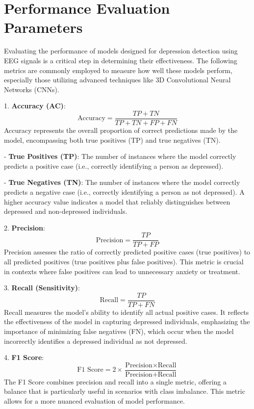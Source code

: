 \documentclass[conference]{IEEEtran}
\begin{document}
\section{Performance Evaluation Parameters}

Evaluating the performance of models designed for depression detection using EEG signals is a critical step in determining their effectiveness. The following metrics are commonly employed to measure how well these models perform, especially those utilizing advanced techniques like 3D Convolutional Neural Networks (CNNs).




1. \textbf{Accuracy (AC)}:
   \[
   \text{Accuracy} = \frac{TP + TN}{TP + TN + FP + FN} \tag{6}
   \]
   Accuracy represents the overall proportion of correct predictions made by the model, encompassing both true positives (TP) and true negatives (TN).
   
   - \textbf{True Positives (TP)}: The number of instances where the model correctly predicts a positive case (i.e., correctly identifying a person as depressed).
   
   - \textbf{True Negatives (TN)}: The number of instances where the model correctly predicts a negative case (i.e., correctly identifying a person as not depressed). A higher accuracy value indicates a model that reliably distinguishes between depressed and non-depressed individuals.

2. \textbf{Precision}:
   \[
   \text{Precision} = \frac{TP}{TP + FP}  \tag{7}
   \]
   Precision assesses the ratio of correctly predicted positive cases (true positives) to all predicted positives (true positives plus false positives). This metric is crucial in contexts where false positives can lead to unnecessary anxiety or treatment.

3. \textbf{Recall (Sensitivity)}:
   \[
   \text{Recall} = \frac{TP}{TP + FN} \tag{8}
   \]
   Recall measures the model's ability to identify all actual positive cases. It reflects the effectiveness of the model in capturing depressed individuals, emphasizing the importance of minimizing false negatives (FN), which occur when the model incorrectly identifies a depressed individual as not depressed.

4. \textbf{F1 Score}:
   \[
   \text{F1 Score} = 2 \times \frac{\text{Precision} \times \text{Recall}}{\text{Precision} + \text{Recall}}  \tag{9}
   \]
   The F1 Score combines precision and recall into a single metric, offering a balance that is particularly useful in scenarios with class imbalance. This metric allows for a more nuanced evaluation of model performance.
\end{document}
